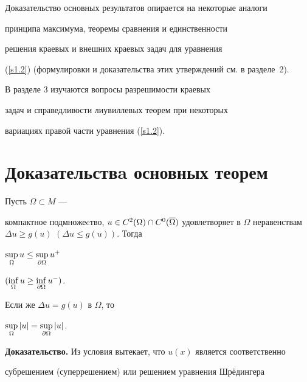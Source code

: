 Доказательство основных результатов опирается на некоторые аналоги


принципа максимума, теоремы сравнения и единственности 


решения краевых и внешних краевых задач для уравнения


(\ref{s1.2}) (формулировки и доказательства этих утверждений см. в разделе~2).








В разделе 3 изучаются вопросы разрешимости краевых


задач и справедливости лиувиллевых теорем при некоторых


вариациях правой части уравнения (\ref{s1.2}).








\section{Доказательствa основных теорем}


\label{sect2}








\begin{props}


Пусть $\Omega\subset M$ ---


компактное подмножеcтво, $u\in C^2(\Omega)\cap C^0(\o


\Omega)$ удовлетворяет в $\Omega$ неравенствам $\Delta u\geq


g(u)$ $(\Delta u\leq g(u))$. Тогда 


$\sup\limits_{\Omega}u\leq\sup\limits_{\partial{\Omega}}u^+$


$(\inf\limits_{\Omega}u\geq\inf\limits_{\partial{\Omega}}u^-)$.


Если же $\Delta u=g(u)$ в $\Omega$, то 


$\sup\limits_{\Omega}|u|=\sup\limits_{\partial{\Omega}}|u|$.


\end{props} 








{\bf Доказательство.} Из условия вытекает, что $u(x)$ является соответственно


субрешением (суперрешением) или решением уравнения Шр\"едингера



